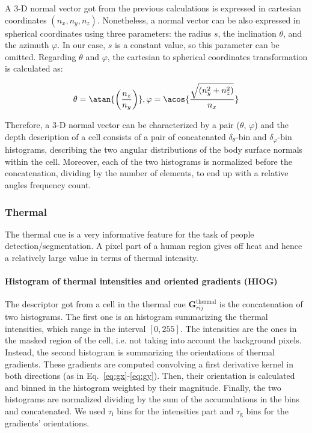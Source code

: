 \documentclass[10pt,twocolumn,letterpaper]{article}
\begin{document}
A 3-D normal vector got from the previous calculations is expressed in cartesian coordinates $(n_x, n_y, n_z)$. Nonetheless, a normal vector can be also expressed in spherical coordinates using three parameters: the radius $s$, the inclination $\theta$, and the azimuth $\varphi$. In our case, $s$ is a constant value, so this parameter can be omitted. Regarding $\theta$ and $\varphi$, the cartesian to spherical coordinates transformation is calculated as:

\begin{gather}	
	\theta  = \atan{\left( \frac{n_z}{n_y} \right)},
	\varphi = \acos{\frac{ \sqrt{(n_y^2 + n_z^2)} }{n_x}}
\end{gather}

Therefore, a 3-D normal vector can be characterized by a pair ($\theta$, $\varphi$) and the depth description of a cell consists of a pair of concatenated $\delta_\theta$-bin and $\delta_\varphi$-bin histograms, describing the two angular distributions of the body surface normals within the cell. Moreover, each of the two histograms is normalized before the concatenation, dividing by the number of elements, to end up with a relative angles frequency count.

\subsubsection{Thermal}
\label{sssec:thermal}

The thermal cue is a very informative feature for the task of people detection/segmentation. A pixel part of a human region gives off heat and hence a relatively large value in terms of thermal intensity.

\paragraph{Histogram of thermal intensities and oriented gradients (HIOG)} 
The descriptor got from a cell in the thermal cue $\mathbf{G}_{rij}^{\mathrm{thermal}}$ is the concatenation of two histograms. The first one is an histogram summarizing the thermal intensities, which range in the interval $[0, 255]$. The intensities are the ones in the masked region of the cell, i.e. not taking into account the background pixels. Instead, the second histogram is summarizing the orientations of thermal gradients. These gradients are computed convolving a first derivative kernel in both directions (as in Eq.~\ref{eq:gx}-\ref{eq:gy}). Then, their orientation is calculated and binned in the histogram weighted by their magnitude. Finally, the two histograms are normalized dividing by the sum of the accumulations in the bins and concatenated. We used $\tau_{\mathrm{i}}$ bins for the intensities part and $\tau_{\mathrm{g}}$ bins for the gradients' orientations.
\end{document}
